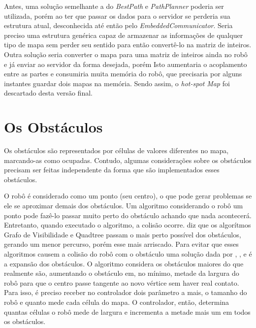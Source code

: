 Antes, uma solução semelhante a do \textit{BestPath} e \textit{PathPlanner} poderia ser utilizada, porém ao ter que passar os dados para o servidor se perderia sua estrutura atual, desconhecida até então pelo \textit{EmbeddedCommunicator}. Seria preciso uma estrutura genérica capaz de armazenar as informações de qualquer tipo de mapa sem perder seu sentido para então convertê-lo na matriz de inteiros. Outra solução seria converter o mapa para uma matriz de inteiros ainda no robô e já enviar ao servidor da forma desejada, porém Isto aumentaria o acoplamento entre as partes e consumiria muita memória do robô, que precisaria por alguns instantes guardar dois mapas na memória. Sendo assim, o \textit{hot-spot} \textit{Map} foi descartado desta versão final.

\section{Os Obstáculos}

Os obstáculos são representados por células de valores diferentes no mapa, marcando-as como ocupadas. Contudo, algumas considerações sobre os obstáculos precisam ser feitas independente da forma que são implementados esses obstáculos.

O robô é considerado como um ponto (seu centro), o que pode gerar problemas se ele se aproximar demais dos obstáculos. Um algoritmo considerando o robô um ponto pode fazê-lo passar muito perto do obstáculo achando que nada acontecerá. Entretanto, quando executado o algoritmo, a colisão ocorre. \cite{Guzman2008} diz que os algorítmos Grafo de Visibilidade e Quadtree passam o mais perto possível dos obstáculos, gerando um menor percurso, porém esse mais arriscado. Para evitar que esses algoritmos causem a colisão do robô com o obstáculo uma solução dada por \cite{Souza2008}, \cite{Guzman2008}, \cite{Siegwart2004} e \cite{Thomsen2010} é a expansão dos obstáculos. O algoritmo considera os obstáculos maiores do que realmente são, aumentando o obstáculo em, no mínimo, metade da largura do robô para que o centro passe tangente ao novo vértice sem haver real contato. Para isso, é preciso receber no controlador dois parâmetro a mais, o tamanho do robô e quanto mede cada célula do mapa. O controlador, então, determina quantas células o robô mede de largura e incrementa a metade mais um em todos os obstáculos.

